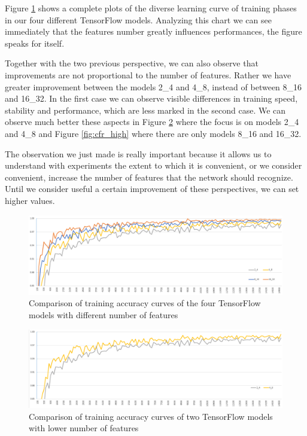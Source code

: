 Figure \ref{fig:cfr_all} shows a complete plots of the diverse learning curve of training phases in our four different TensorFlow models. Analyzing this chart we can see immediately that the features number greatly influences performances, the figure speaks for itself.

Together with the two previous perspective, we can also observe that improvements are not proportional to the number of features. Rather we have greater improvement between the models 2\_4 and 4\_8, instead of between 8\_16 and 16\_32. In the first case we can observe visible differences in training speed, stability and performance, which are less marked in the second case. We can observe much better these aspects in Figure \ref{fig:cfr_low} where the focus is on models 2\_4 and 4\_8 and Figure \ref{fig:cfr_high} where there are only models 8\_16 and 16\_32.

The observation we just made is really important because it allows us to understand with experiments the extent to which it is convenient, or we consider convenient, increase the number of features that the network should recognize. Until we consider useful a certain improvement of these perspectives, we can set higher values. 

\begin{landscape}
	\begin{figure}
		\centering
		\caption{Comparison of training accuracy curves of the four TensorFlow models with different number of features}
		\label{fig:cfr_all}
		\includegraphics[width=1\textheight]{Images/cfr_all}
	\end{figure}
\end{landscape}

\begin{landscape}
\begin{figure}
	\centering
	\caption{Comparison of training accuracy curves of two TensorFlow models with lower number of features}
	\label{fig:cfr_low}
	\includegraphics[width=1\textheight]{Images/cfr_2_4_vs_4_8}
\end{figure}
\end{landscape}

